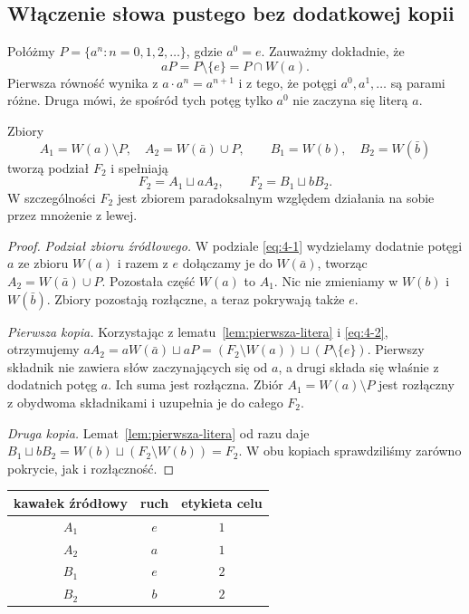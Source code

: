 \subsection{Włączenie słowa pustego bez dodatkowej kopii}
Połóżmy $P=\{a^n:n=0,1,2,\ldots\}$, gdzie $a^0=e$. Zauważmy dokładnie, że
\begin{equation}\label{eq:4-2}
 aP=P\setminus\{e\}=P\cap W(a).
\end{equation}
Pierwsza równość wynika z $a\cdot a^n=a^{n+1}$ i z tego, że potęgi $a^0,a^1,\ldots$ są parami różne. Druga mówi, że spośród tych potęg tylko $a^0$ nie zaczyna się literą $a$.
\begin{twierdzenie}\label{tw:cztery-kawalki}
Zbiory
\begin{equation}\label{eq:4-3}
 A_1=W(a)\setminus P,\quad A_2=W(\bar a)\cup P,
 \qquad B_1=W(b),\quad B_2=W(\bar b)
\end{equation}
tworzą podział $F_2$ i spełniają
\begin{equation}\label{eq:4-4}
 F_2=A_1\sqcup aA_2,\qquad F_2=B_1\sqcup bB_2.
\end{equation}
W szczególności $F_2$ jest zbiorem paradoksalnym względem działania na sobie przez mnożenie z lewej.
\end{twierdzenie}
\begin{proof}
\emph{Podział zbioru źródłowego.} W podziale \eqref{eq:4-1} wydzielamy dodatnie potęgi $a$ ze zbioru $W(a)$ i razem z $e$ dołączamy je do $W(\bar a)$, tworząc $A_2=W(\bar a)\cup P$. Pozostała część $W(a)$ to $A_1$. Nic nie zmieniamy w $W(b)$ i $W(\bar b)$. Zbiory pozostają rozłączne, a teraz pokrywają także $e$.

\emph{Pierwsza kopia.} Korzystając z lematu~\ref{lem:pierwsza-litera} i \eqref{eq:4-2}, otrzymujemy $aA_2=aW(\bar a)\sqcup aP=(F_2\setminus W(a))\sqcup(P\setminus\{e\})$. Pierwszy składnik nie zawiera słów zaczynających się od $a$, a drugi składa się właśnie z dodatnich potęg $a$. Ich suma jest rozłączna. Zbiór $A_1=W(a)\setminus P$ jest rozłączny z obydwoma składnikami i uzupełnia je do całego $F_2$.

\emph{Druga kopia.} Lemat~\ref{lem:pierwsza-litera} od razu daje $B_1\sqcup bB_2=W(b)\sqcup(F_2\setminus W(b))=F_2$. W obu kopiach sprawdziliśmy zarówno pokrycie, jak i rozłączność.
\end{proof}
\begin{center}
\begin{tabular}{c|c|c}
 kawałek źródłowy&ruch&etykieta celu\\\hline
 $A_1$&$e$&$1$\\ $A_2$&$a$&$1$\\ $B_1$&$e$&$2$\\ $B_2$&$b$&$2$
\end{tabular}
\end{center}
